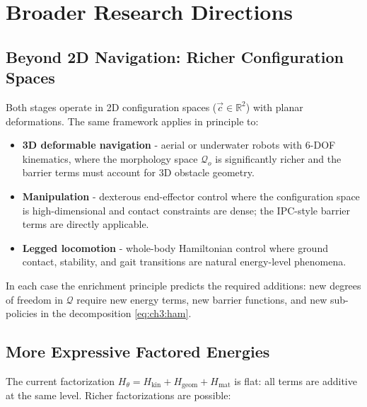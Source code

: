 \section{Broader Research Directions}
\label{sec:ch7:broader}

\subsection{Beyond 2D Navigation: Richer Configuration Spaces}
\label{subsec:ch7:3d}

Both stages operate in 2D configuration spaces ($\vec{c} \in
\mathbb{R}^2$) with planar deformations.
The same framework applies in principle to:

\begin{itemize}
  \item \textbf{3D deformable navigation} - aerial or underwater
        robots with 6-DOF kinematics, where the morphology space
        $\mathcal{Q}_o$ is significantly richer and the barrier
        terms must account for 3D obstacle geometry.
  \item \textbf{Manipulation} - dexterous end-effector control
        where the configuration space is high-dimensional and
        contact constraints are dense; the IPC-style barrier
        terms are directly applicable.
  \item \textbf{Legged locomotion} - whole-body Hamiltonian control
        where ground contact, stability, and gait transitions
        are natural energy-level phenomena.
\end{itemize}

In each case the enrichment principle predicts the required
additions: new degrees of freedom in $\mathcal{Q}$ require new
energy terms, new barrier functions, and new sub-policies in the
decomposition \eqref{eq:ch3:ham}.

\subsection{More Expressive Factored Energies}
\label{subsec:ch7:richer_energy}

The current factorization
$H_\theta = H_{\mathrm{kin}} + H_{\mathrm{geom}} + H_{\mathrm{mat}}$
is flat: all terms are additive at the same level.
Richer factorizations are possible:

